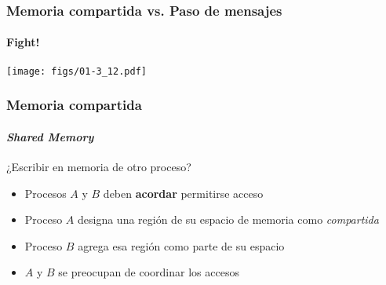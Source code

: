 \documentclass[letter]{beamer}
\begin{document}
\begin{frame}
  \frametitle{Memoria compartida vs. Paso de mensajes}
  \framesubtitle{Fight!}

  \begin{center}
    \texttt{[image: figs/01-3\_12.pdf]}
  \end{center}




\end{frame}
\begin{frame}
  \frametitle{Memoria compartida}
  \framesubtitle{{\em Shared Memory}}

  ¿Escribir en memoria de otro proceso?
  \begin{itemize}
    \item<2-> Procesos $A$ y $B$ deben {\bf acordar} permitirse acceso
    \item<2-> Proceso $A$ designa una región de su espacio de memoria como {\em compartida}
    \item<2-> Proceso $B$ agrega esa región como parte de su espacio
    \item<2-> $A$ y $B$ se preocupan de coordinar los accesos
  \end{itemize}

\end{frame}
\end{document}
